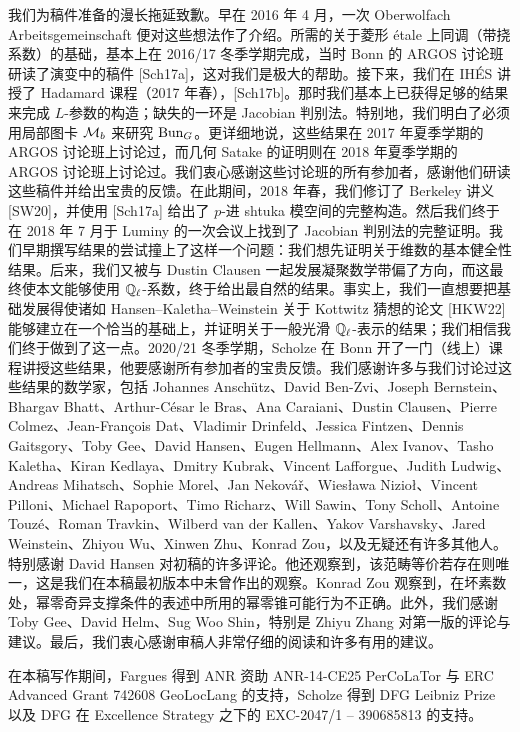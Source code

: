 我们为稿件准备的漫长拖延致歉。早在 2016 年 4 月，一次 Oberwolfach Arbeitsgemeinschaft 便对这些想法作了介绍。所需的关于菱形 \'etale 上同调（带挠系数）的基础，基本上在 2016/17 冬季学期完成，当时 Bonn 的 ARGOS 讨论班研读了演变中的稿件 [Sch17a]，这对我们是极大的帮助。接下来，我们在 IH\'ES 讲授了 Hadamard 课程（2017 年春），[Sch17b]。那时我们基本上已获得足够的结果来完成 $L$-参数的构造；缺失的一环是 Jacobian 判别法。特别地，我们明白了必须用局部图卡 $\mathcal{M}_b$ 来研究 $\mathrm{Bun}_G$。更详细地说，这些结果在 2017 年夏季学期的 ARGOS 讨论班上讨论过，而几何 Satake 的证明则在 2018 年夏季学期的 ARGOS 讨论班上讨论过。我们衷心感谢这些讨论班的所有参加者，感谢他们研读这些稿件并给出宝贵的反馈。在此期间，2018 年春，我们修订了 Berkeley 讲义 [SW20]，并使用 [Sch17a] 给出了 $p$-进 shtuka 模空间的完整构造。然后我们终于在 2018 年 7 月于 Luminy 的一次会议上找到了 Jacobian 判别法的完整证明。我们早期撰写结果的尝试撞上了这样一个问题：我们想先证明关于维数的基本健全性结果。后来，我们又被与 Dustin Clausen 一起发展凝聚数学带偏了方向，而这最终使本文能够使用 $\mathbb{Q}_\ell$-系数，终于给出最自然的结果。事实上，我们一直想要把基础发展得使诸如 Hansen--Kaletha--Weinstein 关于 Kottwitz 猜想的论文 [HKW22] 能够建立在一个恰当的基础上，并证明关于一般光滑 $\mathbb{Q}_\ell$-表示的结果；我们相信我们终于做到了这一点。2020/21 冬季学期，Scholze 在 Bonn 开了一门（线上）课程讲授这些结果，他要感谢所有参加者的宝贵反馈。我们感谢许多与我们讨论过这些结果的数学家，包括 Johannes Anschütz、David Ben-Zvi、Joseph Bernstein、Bhargav Bhatt、Arthur-César le Bras、Ana Caraiani、Dustin Clausen、Pierre Colmez、Jean-François Dat、Vladimir Drinfeld、Jessica Fintzen、Dennis Gaitsgory、Toby Gee、David Hansen、Eugen Hellmann、Alex Ivanov、Tasho Kaletha、Kiran Kedlaya、Dmitry Kubrak、Vincent Lafforgue、Judith Ludwig、Andreas Mihatsch、Sophie Morel、Jan Nekovář、Wiesława Nizioł、Vincent Pilloni、Michael Rapoport、Timo Richarz、Will Sawin、Tony Scholl、Antoine Touzé、Roman Travkin、Wilberd van der Kallen、Yakov Varshavsky、Jared Weinstein、Zhiyou Wu、Xinwen Zhu、Konrad Zou，以及无疑还有许多其他人。特别感谢 David Hansen 对初稿的许多评论。他还观察到，该范畴等价若存在则唯一，这是我们在本稿最初版本中未曾作出的观察。Konrad Zou 观察到，在坏素数处，幂零奇异支撑条件的表述中所用的幂零锥可能行为不正确。此外，我们感谢 Toby Gee、David Helm、Sug Woo Shin，特别是 Zhiyu Zhang 对第一版的评论与建议。最后，我们衷心感谢审稿人非常仔细的阅读和许多有用的建议。

在本稿写作期间，Fargues 得到 ANR 资助 ANR-14-CE25 PerCoLaTor 与 ERC Advanced Grant 742608 GeoLocLang 的支持，Scholze 得到 DFG Leibniz Prize 以及 DFG 在 Excellence Strategy 之下的 EXC-2047/1 -- 390685813 的支持。

